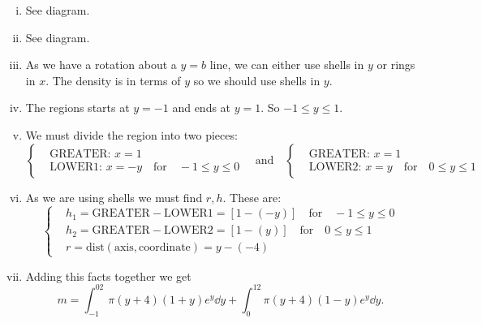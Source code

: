 \documentclass[12pt]{article}
\theoremstyle{plain}
\theoremstyle{definition}
\theoremstyle{remark}
\renewcommand{\leq}{\leqslant}      %
\renewcommand{\:}{\colon}           %
\renewcommand{\.}{\Cdot}                %
\begin{document}
\begin{ptcb}
\begin{enumerate}[i)]
  \itemsep=-0.4em 
  \item See diagram.
  \item See diagram.\vspace{2cm}
  \item As we have a rotation about a $y=b$ line, we can either use shells in $y$ or rings in $x$. The density is in terms of $y$ so we should use shells in $y$.
  \item The regions starts at $y=-1$ and ends at $y=1$. So $-1\leq y\leq 1$.
  \item We must divide the region into two pieces:
  $$
  \left\lbrace
  \begin{aligned}
    &\text{GREATER: } x=1\\
    &\text{LOWER1: } x=-y\quad\text{for}\quad-1\leq y\leq 0
  \end{aligned}
  \right.
  \quad\text{and}\quad
  \left\lbrace
  \begin{aligned}
    &\text{GREATER: } x=1\\
    &\text{LOWER2: } x=y\quad\text{for}\quad 0\leq y\leq 1
  \end{aligned}
  \right.
  $$
  \item As we are using shells we must find $r,h$. These are:
  $$  \left\lbrace
  \begin{aligned}
    & h_1=\text{GREATER}-\text{LOWER1}=[1-(-y)]\quad\text{for}\quad -1\leq y\leq 0\\
    & h_2=\text{GREATER}-\text{LOWER2}=[1-(y)]\quad\text{for}\quad 0\leq y\leq 1\\
    & r=\text{dist}(\text{axis},\text{coordinate})=y-(-4)
  \end{aligned}
  \right.
  $$
  \item Adding this facts together we get 
  $$m=\int_{-1}^02\pi(y+4)(1+y)e^y\dd y+\int_0^12\pi(y+4)(1-y)e^y\dd y.$$
\end{enumerate}
\end{ptcb}
\end{document}
